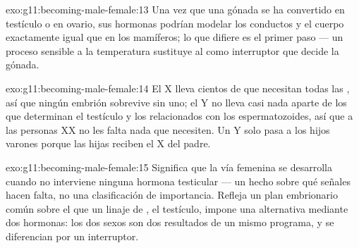 \begin{solution}{exo:g11:becoming-male-female:13}
Una vez que una gónada se ha convertido en testículo o en ovario, sus
hormonas podrían modelar los conductos y el cuerpo exactamente igual
que en los mamíferos; lo que difiere es el primer paso --- un proceso
sensible a la temperatura sustituye al  como interruptor que decide
la gónada.
\end{solution}

\begin{solution}{exo:g11:becoming-male-female:14}
El X lleva cientos de  que necesitan todas las , así que
ningún embrión sobrevive sin uno; el Y no lleva casi nada aparte de los
 que determinan el testículo y los relacionados con los
espermatozoides, así que a las personas XX no les falta nada que
necesiten. Un Y solo pasa a los hijos varones porque las hijas reciben
el X del padre.
\end{solution}

\begin{solution}{exo:g11:becoming-male-female:15}
Significa que la vía femenina se desarrolla cuando no interviene
ninguna hormona testicular --- un hecho sobre qué señales hacen falta,
no una clasificación de importancia. Refleja un plan embrionario común
sobre el que un linaje de , el testículo, impone una alternativa
mediante dos hormonas: los dos sexos son dos resultados de un mismo
programa, y se diferencian por un interruptor.
\end{solution}

